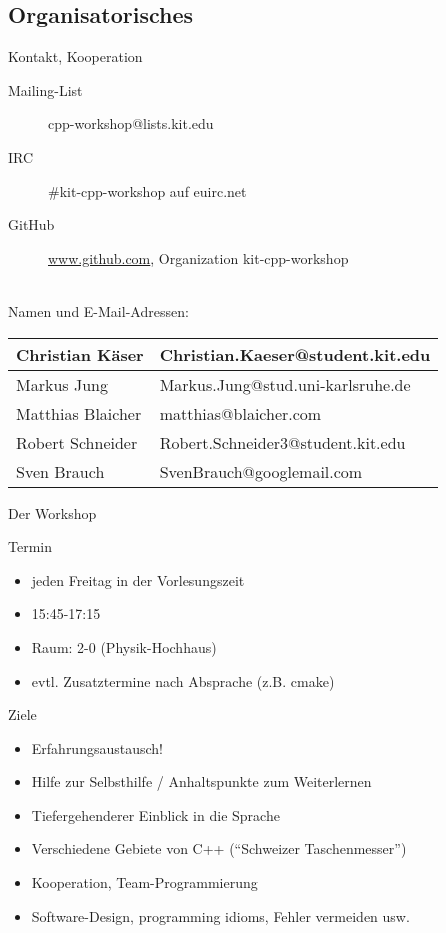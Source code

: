 \subsection{Organisatorisches}

\begin{frame}{Kontakt, Kooperation}
	\begin{description}
		\item[Mailing-List] cpp-workshop@lists.kit.edu
		\item[IRC] \#kit-cpp-workshop auf euirc.net
		\item[GitHub]	\url{www.github.com}, Organization kit-cpp-workshop
	\end{description}
	\ \\
	
	Namen und E-Mail-Adressen:
	\begin{table}
		\begin{tabular}{l|l}
			Christian Käser	&	Christian.Kaeser@student.kit.edu	\\
			\hline
			Markus Jung		&	Markus.Jung@stud.uni-karlsruhe.de	\\
			\hline
			Matthias Blaicher	&	matthias@blaicher.com	\\
			\hline
			Robert Schneider	&	Robert.Schneider3@student.kit.edu	\\
			\hline
			Sven Brauch	&	SvenBrauch@googlemail.com	\\
		\end{tabular}
	\end{table}
\end{frame}

\begin{frame}{Der Workshop}
	\begin{block}{Termin}
		\begin{itemize}
			\item jeden Freitag in der Vorlesungszeit
			\item 15:45-17:15
			\item Raum: 2-0 (Physik-Hochhaus)
			\item evtl. Zusatztermine nach Absprache (z.B. cmake)
		\end{itemize}
	\end{block}
	\pause
	\begin{block}{Ziele}
		\begin{itemize}
			\item Erfahrungsaustausch!
			\item Hilfe zur Selbsthilfe / Anhaltspunkte zum Weiterlernen
			\item Tiefergehenderer Einblick in die Sprache
			\item Verschiedene Gebiete von C++ (\enquote{Schweizer Taschenmesser})
			\item Kooperation, Team-Programmierung
			\item Software-Design, programming idioms, Fehler vermeiden usw.
		\end{itemize}
	\end{block}
\end{frame}

